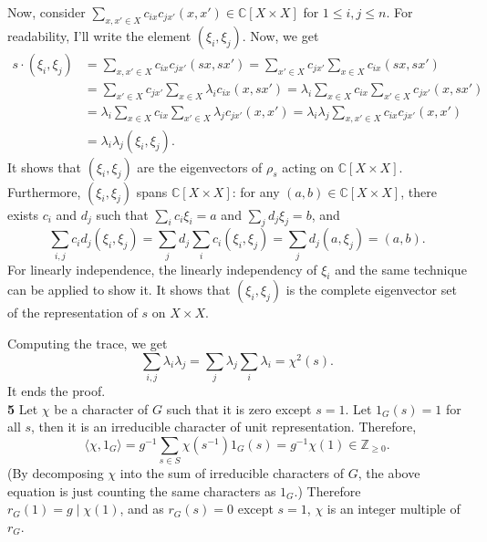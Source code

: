 \documentclass[a4paper, 12pt]{article}
\theoremstyle{Mydefinition}
\theoremstyle{Mytheorem}
\begin{document}
Now, consider $\sum_{x,x'\in X}c_{ix}c_{jx'}(x,x')\in \mathbb{C}[X\times X]$ for $1\leq i,j\leq n$. For readability, I'll write the element $(\xi_i, \xi_j)$. Now, we get
\begin{equation}
\begin{split}
    s\cdot (\xi_i, \xi_j) &= \sum_{x, x'\in X}c_{ix}c_{jx'}(sx,sx')=\sum_{x'\in X}c_{jx'}\sum_{x\in X}c_{ix}(sx,sx')\\
    &=\sum_{x'\in X}c_{jx'}\sum_{x\in X}\lambda_ic_{ix}(x,sx')=\lambda_i\sum_{x\in X}c_{ix}\sum_{x'\in X}c_{jx'}(x,sx')\\
    &=\lambda_i\sum_{x\in X}c_{ix}\sum_{x'\in X}\lambda_j c_{jx'}(x,x')=\lambda_i\lambda_j\sum_{x, x'\in X} c_{ix}c_{jx'}(x,x')\\
    &=\lambda_i\lambda_j(\xi_i, \xi_j).
\end{split}
\end{equation}
It shows that $(\xi_i, \xi_j)$ are the eigenvectors of $\rho_s$ acting on $\mathbb{C}[X\times X]$. Furthermore, $(\xi_i, \xi_j)$ spans $\mathbb{C}[X\times X]$: for any $(a,b)\in \mathbb{C}[X\times X]$, there exists $c_i$ and $d_j$ such that $\sum_{i}c_i \xi_i = a$ and $\sum_j d_j \xi_j = b$, and
\begin{equation}
    \sum_{i,j}c_id_j(\xi_i,\xi_j) = \sum_j d_j\sum_{i}c_i(\xi_i,\xi_j) = \sum_j d_j(a,\xi_j) = (a,b).
\end{equation}
For linearly independence, the linearly independency of $\xi_i$ and the same technique can be applied to show it. It shows that $(\xi_i,\xi_j)$ is the complete eigenvector set of the representation of $s$ on $X\times X$.

Computing the trace, we get
\begin{equation}
    \sum_{i,j}\lambda_i\lambda_j = \sum_{j}\lambda_j\sum_{i}\lambda_i = \chi^2(s).
\end{equation}
It ends the proof.\\

\noindent \textbf{5}
Let $\chi$ be a character of $G$ such that it is zero except $s=1$. Let $1_G(s) = 1$ for all $s$, then it is an irreducible character of unit representation. Therefore,
\begin{equation}
    \langle \chi, 1_G\rangle = g^{-1}\sum_{s\in S}\chi(s^{-1})1_G(s) = g^{-1}\chi(1)\in\mathbb{Z}_{\geq 0}.
\end{equation}
(By decomposing $\chi$ into the sum of irreducible characters of $G$, the above equation is just counting the same characters as $1_G$.) Therefore $r_G(1) = g\mid \chi(1)$, and as $r_G(s)=0$ except $s=1$, $\chi$ is an integer multiple of $r_G$.\\
\end{document}
